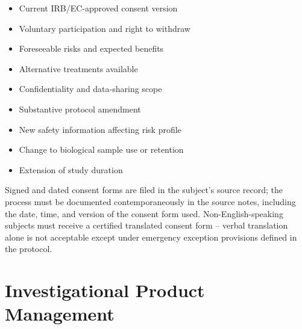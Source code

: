 \documentclass[11pt,a4paper]{scrreprt}
\begin{document}
\begin{minipage}[t]{0.485\linewidth}
\begin{tcolorbox}[colback=white, colframe=sopteal, boxrule=0.7pt, arc=2pt,
  title={\faCheckCircle\ Mandatory Elements}, coltitle=white, colbacktitle=sopteal,
  fonttitle=\bfseries\small, left=6pt, right=6pt, top=4pt, bottom=4pt]
\small
\begin{itemize}
\item Current IRB/EC-approved consent version
\item Voluntary participation and right to withdraw
\item Foreseeable risks and expected benefits
\item Alternative treatments available
\item Confidentiality and data-sharing scope
\end{itemize}
\end{tcolorbox}
\end{minipage}\hfill
\begin{minipage}[t]{0.485\linewidth}
\begin{tcolorbox}[colback=white, colframe=sopamber, boxrule=0.7pt, arc=2pt,
  title={\faExclamationTriangle\ Re-Consent Triggers}, coltitle=white, colbacktitle=sopamber,
  fonttitle=\bfseries\small, left=6pt, right=6pt, top=4pt, bottom=4pt]
\small
\begin{itemize}
\item Substantive protocol amendment
\item New safety information affecting risk profile
\item Change to biological sample use or retention
\item Extension of study duration
\end{itemize}
\end{tcolorbox}
\end{minipage}
\par

Signed and dated consent forms are filed in the subject's source record; the process must be
documented contemporaneously in the source notes, including the date, time, and version of
the consent form used. Non-English-speaking subjects must receive a certified translated
consent form -- verbal translation alone is not acceptable except under emergency exception
provisions defined in the protocol.

\section{Investigational Product Management}
\end{document}
